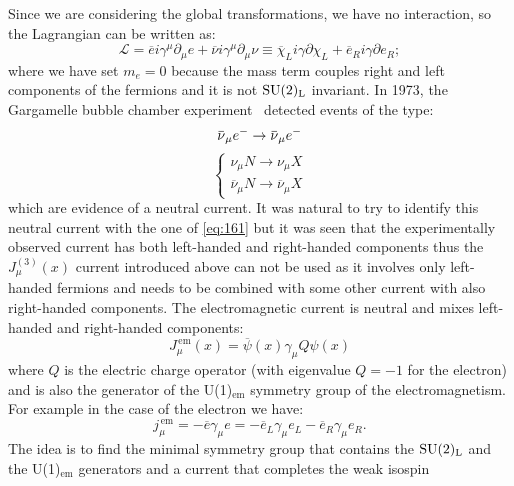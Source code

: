 Since we are considering the global transformations, we have no interaction, so
the Lagrangian can be written as:
\begin{equation}
  \label{eq:2}
  \mathcal{L} = \overbar{e} i \gamma^{\mu} \partial_{\mu} e + \overbar{\nu} i
  \gamma^{\mu} \partial_{\mu} \nu \equiv \overbar{\chi}_{L} i
  \gamma \partial \chi_{L} + \overbar{e}_{R} i \gamma \partial e_{R};
\end{equation}
where we have set $m_{e} = 0$ because the mass term couples right and left
components of the fermions and it is not $\mathrm{SU}(2)_\mathrm{L}$ invariant. In 1973, the
Gargamelle bubble chamber experiment~\cite{Gargamelle} detected events of the
type:
\begin{equation}
  \label{eq:3}
  \overbar{\nu}_{\mu}\eminus \rightarrow \overbar{\nu}_{\mu}\eminus \\
\end{equation}
\begin{equation}
  \label{eq:4}
  \begin{cases}
    \nu_{\mu} N \rightarrow \nu_{\mu} X \\
    \overbar{\nu}_{\mu} N \rightarrow \overbar{\nu}_{\mu} X
  \end{cases}
\end{equation}
which are evidence of a neutral current. It was natural to try to identify this
neutral current with the one of \cref{eq:161} but it was seen that the
experimentally observed current has both left-handed and right-handed components
thus the $J^{(3)}_{\mu}(x)$ current introduced above can not be used as it
involves only left-handed fermions and needs to be combined with some other
current with also right-handed components. The electromagnetic current is
neutral and mixes left-handed and right-handed components:
\begin{equation}
  \label{eq:5}
  J_{\mu}^\mathrm{\, em} (x) = \overbar{\psi}(x) \gamma_{\mu} Q \psi (x)
\end{equation}
where $Q$ is the electric charge operator (with eigenvalue $Q = -1$ for the
electron) and is also the generator of the U(1)$_\mathrm{em}$ symmetry group of
the electromagnetism. For example in the case of the electron we have:
\begin{equation}
  \label{eq:162}
  j_\mu^\mathrm{\, em} = - \overbar{e} \gamma_\mu e = - \overbar{e}_L \gamma_\mu
  e_L - \overbar{e}_R \gamma_\mu e_R.
\end{equation}
The idea is to find the minimal symmetry group that contains the $\mathrm{SU}(2)_\mathrm{L}$ and
the U(1)$_\mathrm{em}$ generators and a current that completes the weak isospin
